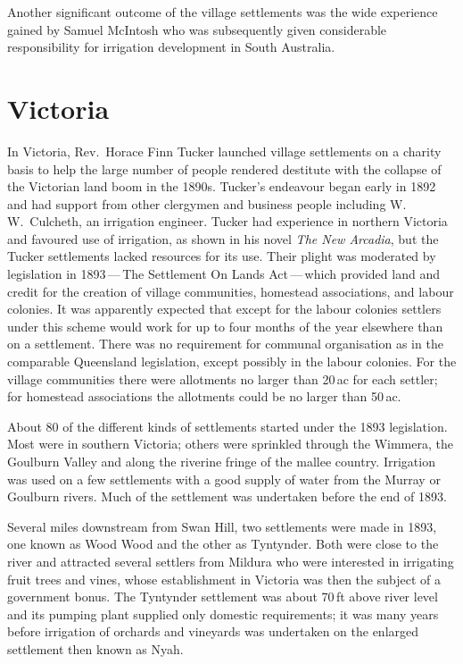Another significant outcome of the village settlements was the wide
experience gained by Samuel McIntosh who was subsequently given
considerable responsibility for irrigation development in South
Australia.

\section*{Victoria}

In Victoria, Rev.~Horace Finn Tucker launched village settlements on a
charity basis to help the large number of people rendered destitute
with the collapse of the Victorian land boom in the 1890s.  Tucker's
endeavour began early in 1892 and had support from other clergymen and
business people including W.\,W.~Culcheth, an irrigation engineer.
Tucker had experience in northern Victoria and favoured use of
irrigation, as shown in his novel \textsl{The New Arcadia}, but the
Tucker settlements lacked resources for its use.  Their plight was
moderated by legislation in 1893\,---\,The Settlement On Lands
Act\,---\,which provided land and credit for the creation of village
communities, homestead associations, and labour colonies.  It was
apparently expected that except for the labour colonies settlers under
this scheme would work for up to four months of the year elsewhere
than on a settlement.  There was no requirement for communal
organisation as in the comparable Queensland legislation, except
possibly in the labour colonies.  For the village communities there
were allotments no larger than 20\,ac for each settler; for homestead
associations the allotments could be no larger than
50\,ac.

About 80 of the different kinds of settlements started under the 1893
legislation.  Most were in southern Victoria; others were sprinkled
through the Wimmera, the Goulburn Valley and along the riverine fringe
of the mallee country.  Irrigation was used on a few settlements with
a good supply of water from the Murray or Goulburn rivers.  Much of
the settlement was undertaken before the end of 1893.

Several miles downstream from Swan Hill, two settlements were made in
1893, one known as Wood Wood and the other as Tyntynder.  Both were
close to the river and attracted several settlers from Mildura who
were interested in irrigating fruit trees and vines, whose
establishment in Victoria was then the subject of a government bonus.
The Tyntynder settlement was about 70\,ft above river level and its
pumping plant supplied only domestic requirements; it was many years
before irrigation of orchards and vineyards was undertaken on the
enlarged settlement then known as
Nyah.

